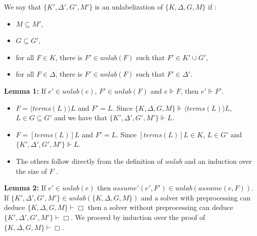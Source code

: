 \documentclass[a4paper,10pt]{report}
\newcommand{\terms}{\mathit{terms}}
\newcommand{\A}{\mathit{assume}}
\newcommand{\unlab}{\mathit{unlab}}
\begin{document}
We say that $\{K',\Delta', G', M'\}$ is an unlabelization of $\{K,\Delta, G, M\}$ if :
\begin{itemize}
 \item $M\subseteq M'$,
 \item $G\subseteq G'$,
 \item for all $F \in K$, there is $F'\in\unlab(F)$ such that $F'\in K'\cup G'$,
 \item for all $F \in\Delta$, there is $F'\in\unlab(F)$ such that $F'\in\Delta'$.
\end{itemize}
\textbf{Lemma 1:} If $e'\in\unlab(e)$, $F'\in\unlab(F)$ and $e\Vdash F$, then $e'\Vdash F'$.
\begin{itemize}
 \item $F=\langle\terms(L)\rangle L$ and $F'=L$. Since $\{K,\Delta,G,M\}\Vdash\langle\terms(L)\rangle L$,
$L\in G\subseteq G'$ and we have that  $\{K',\Delta',G',M'\}\Vdash L$.
 \item $F=[\terms(L)]L$ and $F'=L$. Since $[\terms(L)]L\in K$, $L\in G'$ and $\{K',\Delta',G',M'\}\Vdash L$.
 \item The others follow directly from the definition of $\unlab$ and an induction over the size of $F$ .
\end{itemize}
\textbf{Lemma 2:} If $e'\in\unlab(e)$ then $\A'(e',F')\in\unlab(\A(e, F))$.\\
If $\{K',\Delta',G',M'\}\in\unlab(\{K,\Delta,G,M\})$ and a solver with preprocessing
can deduce $\{K,\Delta,G,M\}\vdash\Box$
then a solver without preprocessing can deduce $\{K',\Delta',G',M'\}\vdash\Box$. We proceed by
induction over the proof of $\{K,\Delta,G,M\}\vdash\Box$.
\end{document}
